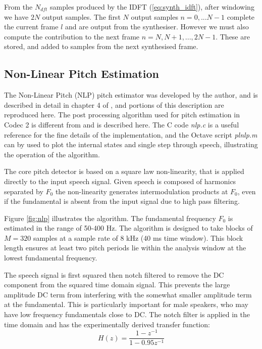 \documentclass{article}
\begin{document}
From the $N_{dft}$ samples produced by the IDFT (\ref{eq:synth_idft}), after windowing we have $2N$ output samples. The first $N$ output samples $n=0,...N-1$ complete the current frame $l$ and are output from the synthesiser.  However we must also compute the contribution to the next frame $n = N,N+1,...,2N-1$.  These are stored, and added to samples from the next synthesised frame.

\subsection{Non-Linear Pitch Estimation}

The Non-Linear Pitch (NLP) pitch estimator was developed by the author, and is described in detail in chapter 4 of \cite{rowe1997techniques}, and portions of this description are reproduced here.  The post processing algorithm used for pitch estimation in Codec 2 is different from \cite{rowe1997techniques} and is described here.  The C code \emph{nlp.c} is a useful reference for the fine details of the implementation, and the Octave script \emph{plnlp.m} can by used to plot the internal states and single step through speech, illustrating the operation of the algorithm.

The core pitch detector is based on a square law non-linearity, that is applied directly to the input speech signal. Given speech is composed of harmonics separated by $F_0$ the non-linearity generates intermodulation products at $F_0$, even if the fundamental is absent from the input signal due to high pass filtering.

Figure \ref{fig:nlp} illustrates the algorithm. The fundamental frequency $F_0$ is estimated in the range of 50-400 Hz. The algorithm is designed to take blocks of $M = 320$ samples at a sample rate of 8 kHz (40 ms time window). This block length ensures at least two pitch periods lie within the analysis window at the lowest fundamental frequency.

The speech signal is first squared then notch filtered to remove the DC component from the squared time domain signal. This prevents the large amplitude DC term from interfering with the somewhat smaller amplitude term at the fundamental. This is particularly important for male speakers, who may have low frequency fundamentals close to DC. The notch filter is applied in the time domain and has the experimentally derived transfer function:
\begin{equation}
H(z) = \frac{1-z^{-1}}{1-0.95z^{-1}}
\end{equation}
\end{document}
